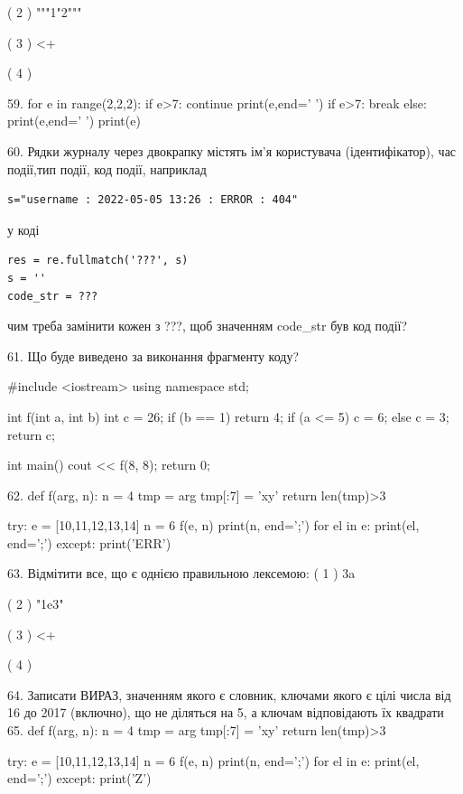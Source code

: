 \documentclass[11pt]{article}
\begin{document}
( 2 ) """1"2"""

( 3 ) <+

( 4 ) {

59. 
for e in range(2,2,2):
    if e>7:
        continue
        print(e,end=' ')
    if e>7:
        break
    else:
        print(e,end=' ')
    print(e)

60. 
Рядки журналу через двокрапку містять ім'я користувача (ідентифікатор), час події,тип події, код події, наприклад
\begin{verbatim}
s="username : 2022-05-05 13:26 : ERROR : 404"
\end{verbatim}
у коді 
\begin{verbatim}
res = re.fullmatch('???', s) 
s = ''
code_str = ??? 
\end{verbatim}
чим треба замінити кожен з ???, щоб значенням code\_str був код події? 



61. Що буде виведено за виконання фрагменту коду?

#include <iostream>
using namespace std;

int f(int a, int b){
    int c = 26;
    if (b == 1)
        return 4;
    if (a <= 5)
         c = 6;
    else 
        c = 3;
    return c;
}

int main(){
    cout << f(8, 8);
    return 0;
}

62. 
def f(arg, n):
    n = 4
    tmp = arg
    tmp[:7] = 'xy'
    return len(tmp)>3

try:
    e = [10,11,12,13,14]
    n = 6
    f(e, n)
    print(n, end=';')
    for el in e:
        print(el, end=';')
except:
    print('ERR')

63. %
Відмітити все, що є однією правильною лексемою:
( 1 ) 3a

( 2 ) "1e3"

( 3 ) <+

( 4 ) {

64. 
Записати ВИРАЗ, значенням якого є словник, ключами якого є цілі числа від 16 до 2017 (включно), що не діляться на 5, а ключам відповідають їх квадрати 
65. 
def f(arg, n):
    n = 4
    tmp = arg
    tmp[:7] = 'xy'
    return len(tmp)>3

try:
    e = [10,11,12,13,14]
    n = 6
    f(e, n)
    print(n, end=';')
    for el in e:
        print(el, end=';')
except:
    print('Z')

}}
\end{document}
